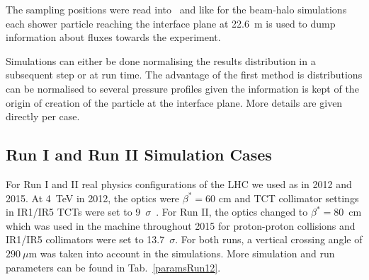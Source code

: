 The sampling positions were read into \fluka~and like for the beam-halo simulations each shower particle reaching the interface plane at 22.6~m is used to dump information about fluxes towards the experiment. %

Simulations can either be done normalising the results distribution in a subsequent step or at run time. The advantage of the first method is distributions can be normalised to several pressure profiles given the information is kept of the origin of creation of the particle at the interface plane. More details are given directly per case.%



\subsection{Run I and Run II Simulation Cases}
For Run I and II real physics configurations of the LHC we used as in 2012 and 2015. At 4~TeV in 2012, the optics were $\beta^* = 60$ cm and TCT collimator settings in IR1/IR5 TCTs were set to 9~$\sigma$~\cite{parametersRun1}. For Run II, the optics changed to $\beta^* = 80$~cm which was used in the machine throughout 2015 for proton-proton collisions and IR1/IR5 collimators were set to 13.7~$\sigma$. For both runs, a vertical crossing angle of $290~\mu$m was taken into account in the simulations. More simulation and run parameters can be found in Tab.~\ref{paramsRun12}. 

